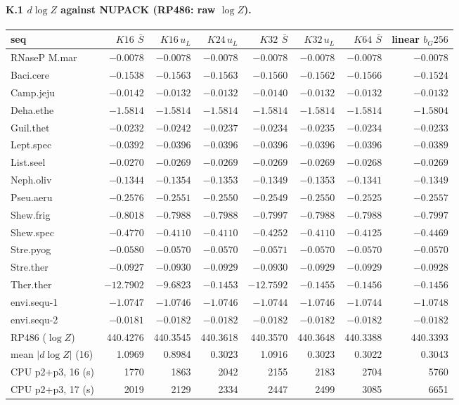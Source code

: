 \documentclass[11pt]{article}
\begin{document}
\paragraph{K.1 $d\log Z$ against NUPACK (RP486: raw $\log Z$).}
\begin{center}
\footnotesize
\begin{tabular}{@{}lrrrrrrr@{}}
\toprule
seq & $K16$ $\bar S$ & $K16\,u_L$ & $K24\,u_L$ & $K32$ $\bar S$ & $K32\,u_L$ & $K64$ $\bar S$ & linear $b_G256$ \\
\midrule
RNaseP M.mar & $-0.0078$ & $-0.0078$ & $-0.0078$ & $-0.0078$ & $-0.0078$ & $-0.0078$ & $-0.0078$ \\
Baci.cere & $-0.1538$ & $-0.1563$ & $-0.1563$ & $-0.1560$ & $-0.1562$ & $-0.1566$ & $-0.1524$ \\
Camp.jeju & $-0.0142$ & $-0.0132$ & $-0.0132$ & $-0.0140$ & $-0.0132$ & $-0.0132$ & $-0.0132$ \\
Deha.ethe & $-1.5814$ & $-1.5814$ & $-1.5814$ & $-1.5814$ & $-1.5814$ & $-1.5814$ & $-1.5804$ \\
Guil.thet & $-0.0232$ & $-0.0242$ & $-0.0237$ & $-0.0234$ & $-0.0235$ & $-0.0234$ & $-0.0233$ \\
Lept.spec & $-0.0392$ & $-0.0396$ & $-0.0396$ & $-0.0396$ & $-0.0396$ & $-0.0396$ & $-0.0389$ \\
List.seel & $-0.0270$ & $-0.0269$ & $-0.0269$ & $-0.0269$ & $-0.0269$ & $-0.0268$ & $-0.0269$ \\
Neph.oliv & $-0.1344$ & $-0.1354$ & $-0.1353$ & $-0.1349$ & $-0.1353$ & $-0.1341$ & $-0.1349$ \\
Pseu.aeru & $-0.2576$ & $-0.2551$ & $-0.2550$ & $-0.2549$ & $-0.2550$ & $-0.2525$ & $-0.2557$ \\
Shew.frig & $-0.8018$ & $-0.7988$ & $-0.7988$ & $-0.7997$ & $-0.7988$ & $-0.7988$ & $-0.7997$ \\
Shew.spec & $-0.4770$ & $-0.4110$ & $-0.4110$ & $-0.4252$ & $-0.4110$ & $-0.4125$ & $-0.4469$ \\
Stre.pyog & $-0.0580$ & $-0.0570$ & $-0.0570$ & $-0.0571$ & $-0.0570$ & $-0.0570$ & $-0.0570$ \\
Stre.ther & $-0.0927$ & $-0.0930$ & $-0.0929$ & $-0.0930$ & $-0.0929$ & $-0.0929$ & $-0.0928$ \\
Ther.ther & $-12.7902$ & $-9.6823$ & $-0.1453$ & $-12.7592$ & $-0.1455$ & $-0.1456$ & $-0.1456$ \\
envi.sequ-1 & $-1.0747$ & $-1.0746$ & $-1.0746$ & $-1.0744$ & $-1.0746$ & $-1.0744$ & $-1.0748$ \\
envi.sequ-2 & $-0.0181$ & $-0.0182$ & $-0.0182$ & $-0.0182$ & $-0.0182$ & $-0.0182$ & $-0.0182$ \\
RP486 ($\log Z$) & 440.4276 & 440.3545 & 440.3618 & 440.3570 & 440.3648 & 440.3388 & 440.3393 \\
\midrule
mean $|d\log Z|$ (16) & 1.0969 & 0.8984 & 0.3023 & 1.0916 & 0.3023 & 0.3022 & 0.3043 \\
CPU p2+p3, 16 (s) & 1770 & 1863 & 2042 & 2155 & 2183 & 2704 & 5760 \\
CPU p2+p3, 17 (s) & 2019 & 2129 & 2334 & 2447 & 2499 & 3085 & 6651 \\
\bottomrule
\end{tabular}
\end{center}
\end{document}
